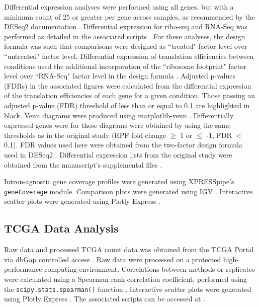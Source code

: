 \documentclass[10pt, oneside]{article}
\begin{document}
Differential expression analyses were performed using all genes, but with a minimum count of 25 or greater per gene across samples, as recommended by the DESeq2 documentation \cite{deseq2}. Differential expression for ribo-seq and RNA-Seq was performed as detailed in the associated scripts \cite{manuscript}. For these analyses, the design formula was such that comparisons were designed as ``treated" factor level over ``untreated" factor level. Differential expression of translation efficiencies between conditions used the additional incorporation of the ``ribosome footprint" factor level over ``RNA-Seq" factor level in the design formula \cite{deseq2,isrib_riboseq,ingolia_meth}. Adjusted p-values (FDRs) in the associated figures were calculated from the differential expression of the translation efficiencies of each gene for a given condition. Those passing an adjusted p-value (FDR) threshold of less than or equal to 0.1 are highlighted in black. Venn diagrams were produced using matplotlib-venn \cite{matvenn}. Differentially expressed genes were for these diagrams were obtained by using the same thresholds as in the original study (RPF fold change $\geq$ 1 or $\leq$ -1, FDR $<$ 0.1). FDR values used here were obtained from the two-factor design formula used in DESeq2 \cite{deseq2}. Differential expression lists from the original study were obtained from the manuscript's supplemental files \cite{isrib_riboseq}.\par

Intron-agnostic gene coverage profiles were generated using XPRESSpipe's \texttt{geneCoverage} module. Comparison plots were generated using IGV \cite{igv}. Interactive scatter plots were generated using Plotly Express \cite{plotly}. \\

\subsection*{TCGA Data Analysis}
Raw data and processed TCGA count data was obtained from the TCGA Portal \cite{tcga} via dbGap controlled access \cite{dbgap}. Raw data were processed on a protected high-performance computing environment. Correlations between methods or replicates were calculated using a Spearman rank correlation coefficient, performed using the \texttt{scipy.stats.spearman()} function \cite{spearman_rnaseq}. Interactive scatter plots were generated using Plotly Express \cite{plotly}. The associated scripts can be accessed at \cite{manuscript}. \\
\end{document}
